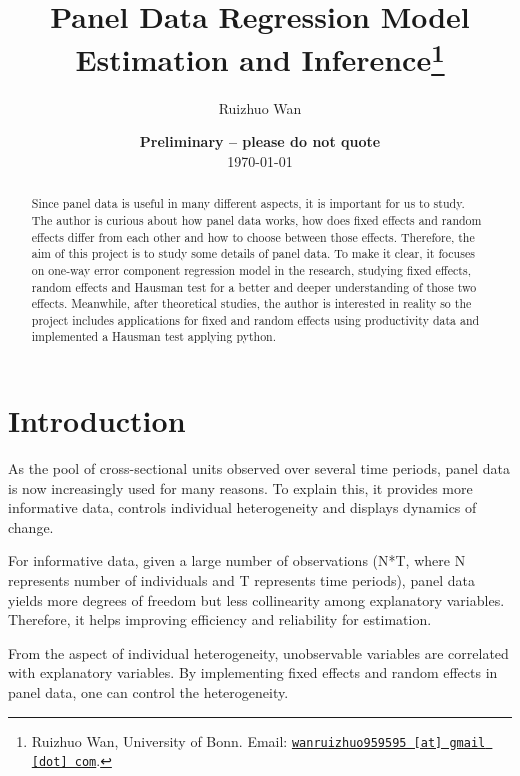\documentclass[11pt, a4paper, leqno]{article}
\begin{document}
\title{Panel Data Regression Model Estimation and Inference\thanks{Ruizhuo Wan, University of Bonn. Email: \href{mailto:wanruizhuo959595@gmail.com}{\nolinkurl{wanruizhuo959595 [at] gmail [dot] com}}.}}

\author{Ruizhuo Wan}

\date{
{\bf Preliminary -- please do not quote} 
\\[1ex] 
\today
}

\maketitle


\begin{abstract}
	Since panel data is useful in many different aspects, it is important for us to study. The author is curious about how panel data works, how does fixed effects and random effects differ from each other and how to choose between those effects. Therefore, the aim of this project is to study some details of panel data. To make it clear, it focuses on one-way error component regression model in the research, studying fixed effects, random effects and Hausman test for a better and deeper understanding of those two effects. Meanwhile, after theoretical studies, the author is interested in reality so the project includes applications for fixed and random effects using productivity data and implemented a Hausman test applying python.
\end{abstract}
\clearpage

\section{Introduction} %
\label{sec:introduction}

As the pool of cross-sectional units observed over several time periods, panel data is now increasingly used for many reasons. To explain this, it provides more informative data, controls individual heterogeneity and displays dynamics of change.


For informative data, given a large number of observations (N*T, where N represents number of individuals and T represents time periods), panel data yields more degrees of freedom but less collinearity among explanatory variables. Therefore, it helps improving efficiency and reliability for estimation.


From the aspect of individual heterogeneity, unobservable variables are correlated with explanatory variables. By implementing fixed effects and random effects in panel data, one can control the heterogeneity.
\end{document}
